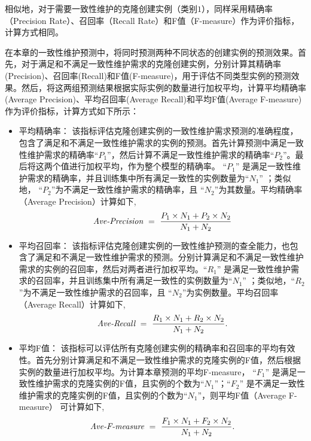 相似地，对于需要一致性维护的克隆创建实例（类别$1$），同样采用精确率（Precision Rate）、召回率（Recall Rate）和F值（F-measure）作为评价指标，计算方式相同。

在本章的一致性维护预测中，将同时预测两种不同状态的创建实例的预测效果。首先，对于满足和不满足一致性维护需求的克隆创建实例，分别计算其精确率(Precision)、召回率(Recall)和F值(F-measure)，用于评估不同类型实例的预测效果。然后，将这两组预测结果根据实际实例的数量进行加权平均，计算平均精确率(Average Precision)、平均召回率(Average Recall)和平均F值(Average F-measure)作为评价指标，计算方式如下所示：

\begin{itemize}

\item
平均精确率：
 该指标评估克隆创建实例的一致性维护需求预测的准确程度，包含了满足和不满足一致性维护需求的实例的预测。首先计算预测中满足一致性维护需求的精确率``$P_1$''，然后计算不满足一致性维护需求的精确率``$P_2$''。最后将这两个值进行加权平均，作为整个模型的精确率。 ``$P_1$'' 是满足一致性维护需求的精确率，并且训练集中所有满足一致性的实例数量为``$N_1$'' ；类似地， ``$P_2$''为不满足一致性维护需求的精确率，且 ``$N_2$''为其数量。平均精确率（Average Precision）计算如下,
\begin{equation} 
\mbox{\it Ave-Precision} ~=~ {\frac {P_1 \times N_1 + P_2 \times N_2}{N_1 + N_2}}
\end{equation}

\item
平均召回率：
该指标评估克隆创建实例的一致性维护预测的查全能力，也包含了满足和不满足一致性维护需求的预测。分别计算满足和不满足一致性维护需求的实例的召回率，然后对两者进行加权平均。“$R_1$” 是满足一致性维护需求的召回率，并且训练集中所有满足一致性的实例数量为“$N_1$” ；类似地，“$R_2$”为不满足一致性维护需求的召回率，且 “$N_2$”为实例数量。平均召回率（Average Recall）计算如下,
\begin{equation} 
\mbox{\it Ave-Recall} ~=~ {\frac  {R_1 \times N_1 + R_2 \times N_2}{N_1 + N_2}}.
\end{equation}

\item
平均F值：
该指标可以评估所有克隆创建实例的精确率和召回率的平均有效性。首先分别计算满足和不满足一致性维护需求的克隆实例的F值，然后根据实例的数量进行加权平均。为计算本章预测的平均F-measure， ``$F_1$'' 是满足一致性维护需求的克隆实例的F值，且实例的个数为``$N_1$''；``$F_2$'' 是不满足一致性维护需求的克隆实例的F值，且实例的个数为``$N_1$''，则平均F值（Average F-measure） 可计算如下,
\begin{equation} 
\mbox{\it Ave-F-measure} ~=~ {\frac  {F_1 \times N_1 + F_2 \times N_2}{N_1 + N_2}}.
\end{equation}

\end{itemize}

